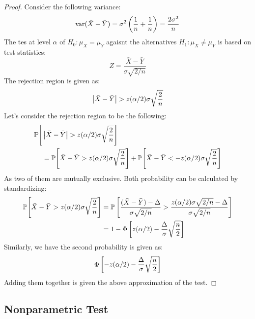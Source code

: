 \begin{proof}
    Consider the following variance:
    \begin{equation*}
        \operatorname{var}(\bar{X} - \bar{Y}) = \sigma^2\left( \frac{1}{n} + \frac{1}{n} \right) = \frac{2\sigma^2}{n}
    \end{equation*}
    The tes at level $\alpha$ of $H_0 : \mu_X = \mu_Y$ agaisnt the alternatives $H_1 : \mu_X \ne \mu_Y$ is based on test statistics:
    \begin{equation*}
        Z = \frac{\bar{X} - \bar{Y}}{\sigma\sqrt{2/n}}
    \end{equation*}
    The rejection region is given as:
    \begin{equation*}
        \left| \bar{X} - \bar{Y} \right| > z(\alpha/2)\sigma\sqrt{\frac{2}{n}}
    \end{equation*}
    Let's consider the rejection region to be the following:
    \begin{equation*}
    \begin{aligned}
        \mathbb{P}\Bigg[ &\left| \bar{X} - \bar{Y} \right| > z(\alpha/2)\sigma\sqrt{\frac{2}{n}} \Bigg] \\
        &= \mathbb{P}\Bigg[ \bar{X} - \bar{Y} > z(\alpha/2)\sigma\sqrt{\frac{2}{n}} \Bigg] + \mathbb{P}\Bigg[ \bar{X} - \bar{Y} <- z(\alpha/2)\sigma\sqrt{\frac{2}{n}} \Bigg]
    \end{aligned}
    \end{equation*}
    As two of them are mutually exclusive. Both probability can be calculated by standardizing:
    \begin{equation*}
    \begin{aligned}
        \mathbb{P}\Bigg[ \bar{X} - \bar{Y} > z(\alpha/2)\sigma\sqrt{\frac{2}{n}} \Bigg] &= \mathbb{P}\left[ \frac{(\bar{X} - \bar{Y})- \Delta}{\sigma\sqrt{2/n}} > \frac{z(\alpha/2)\sigma\sqrt{2/n} - \Delta}{\sigma\sqrt{2/n}} \right] \\
        &= 1 - \Phi\left[ z(\alpha/2) - \frac{\Delta}{\sigma}\sqrt{\frac{n}{2}} \right]
    \end{aligned}
    \end{equation*}
    Similarly, we have the second probability is given as:
    \begin{equation*}
        \Phi\left[ -z(\alpha/2) - \frac{\Delta}{\sigma}\sqrt{\frac{n}{2}} \right]
    \end{equation*}
    Adding them together is given the above approximation of the test. 
\end{proof}

\subsection{Nonparametric Test}

